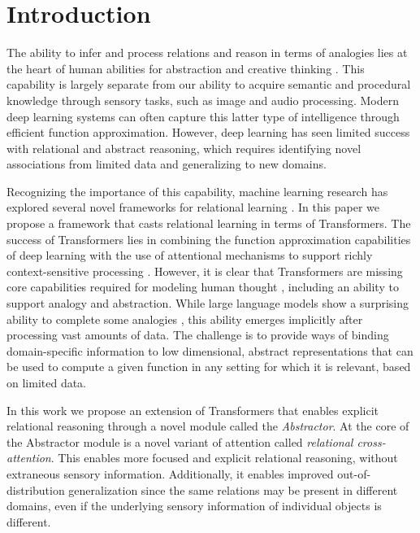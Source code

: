 \section{Introduction}

The ability to infer and process relations and reason in terms 
of analogies lies at the heart of human abilities for abstraction and creative thinking
\citep{snow,holyoak}. This capability is 
largely separate from our ability to acquire semantic and procedural 
knowledge through sensory tasks, such as image and audio processing. Modern 
deep learning systems can often capture this latter type of intelligence 
through efficient function approximation. However, deep learning has 
seen limited success with relational and abstract reasoning, which 
requires identifying novel associations  from limited data
and generalizing to new domains. 

Recognizing the importance of this capability,
machine learning research has explored several novel frameworks for relational learning \citep{TEM, NTM,episodicControl,esbn,mondal23learned,
battaglia,barrett:2018,santoro1}. 
In this paper we propose a framework that casts relational learning in terms of Transformers. 
The success of Transformers lies in combining the function approximation capabilities of deep learning with the use
of attentional mechanisms to support richly context-sensitive processing \citep{transformers,vaswani2017attention,
    kerg2020untangling}. However, it is clear that Transformers are missing core capabilities required for modeling
human thought \citep{mahowald2023dissociating}, including an ability to support analogy and abstraction.
While large language models show a surprising ability to complete some analogies \citep{webb}, this ability
emerges implicitly after processing vast amounts of data. The challenge is to provide ways of binding
domain-specific information to low dimensional, abstract representations that can be used to compute a given function
in any setting for which it is relevant, based on limited data.


In this work we propose an extension of Transformers that enables explicit relational reasoning through a novel module called the \textit{Abstractor}.  At the core of the Abstractor module is a novel variant of attention called \textit{relational cross-attention}. This enables more focused and explicit relational reasoning, without extraneous sensory information. Additionally, it enables improved out-of-distribution generalization since the same relations may be present in different domains, even if the underlying sensory information of individual objects is different.

